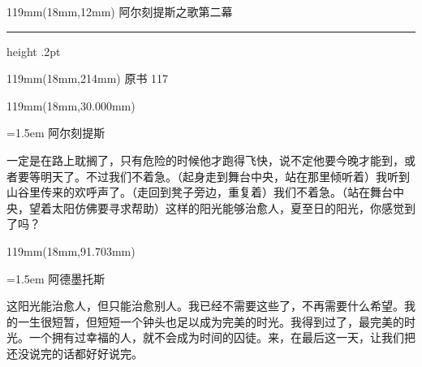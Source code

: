 \documentclass{article}
\newcommand{\ZHsetup}{\normalfont\color{ink}\fontsize{10.5}{17}\selectfont\emergencystretch=1.5em}
\newcommand{\ZHspeaker}[1]{{\hei\fontsize{10.3}{13}\selectfont #1}\par\vspace{3pt}}
\newcommand{\Block}[3]{\begin{textblock*}{119mm}(18mm,#1mm){#2 #3\par}\end{textblock*}}
\newcommand{\Heading}[3]{%
  \begin{textblock*}{119mm}(18mm,12mm)
    \color{quiet}\fontsize{7.5}{10}\selectfont
    #1\hfill #2\par\vspace{3mm}\hrule height .2pt
  \end{textblock*}
  \begin{textblock*}{119mm}(18mm,214mm)
    \color{quiet}\fontsize{7}{10}\selectfont #3\hfill\thepage
  \end{textblock*}
}
\begin{document}
\newpage
\null
\Heading{阿尔刻提斯之歌}{第二幕}{原书 117}
\Block{30.000}{\ZHsetup}{\ZHspeaker{阿尔刻提斯}一定是在路上耽搁了，只有危险的时候他才跑得飞快，说不定他要今晚才能到，或者要等明天了。不过我们不着急。{\kai （起身走到舞台中央，站在那里倾听着）}我听到山谷里传来的欢呼声了。{\kai （走回到凳子旁边，重复着）}我们不着急。{\kai （站在舞台中央，望着太阳仿佛要寻求帮助）}这样的阳光能够治愈人，夏至日的阳光，你感觉到了吗？\par }
\Block{91.703}{\ZHsetup}{\ZHspeaker{阿德墨托斯}这阳光能治愈人，但只能治愈别人。我已经不需要这些了，不再需要什么希望。我的一生很短暂，但短短一个钟头也足以成为完美的时光。我得到过了，最完美的时光。一个拥有过幸福的人，就不会成为时间的囚徒。来，在最后这一天，让我们把还没说完的话都好好说完。\par }
\end{document}
